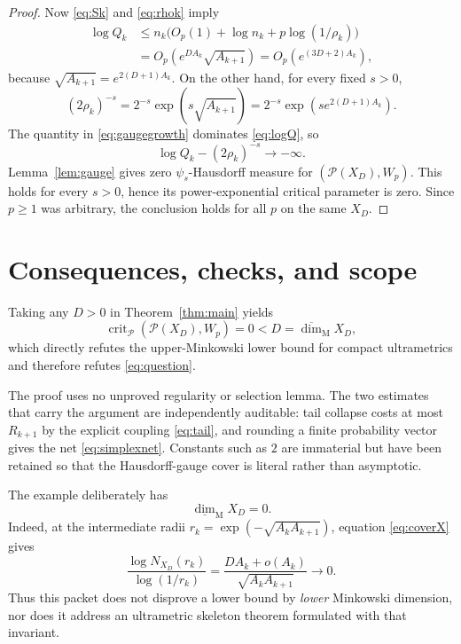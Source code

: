 \documentclass[11pt]{article}
\newcommand{\Pcal}{\mathscr P}
\newcommand{\Prob}{\mathcal P}
\newcommand{\Mdim}{\overline{\dim}_{\mathrm M}}
\begin{document}
\begin{proof}
Now \eqref{eq:Sk} and \eqref{eq:rhok} imply
\[
 \begin{aligned}
 \log Q_k
 &\leq n_k\bigl(O_p(1)+\log n_k+p\log(1/\rho_k)\bigr)\\
 &=O_p\!\left(
       e^{DA_k}\sqrt{A_{k+1}}
     \right)
 =O_p\!\left(e^{(3D+2)A_k}\right),
 \end{aligned}
\tag{10}\label{eq:logQ}
\]
because $\sqrt{A_{k+1}}=e^{2(D+1)A_k}$.  On the other hand, for every
fixed $s>0$,
\[
 (2\rho_k)^{-s}
 =2^{-s}\exp\!\left(s\sqrt{A_{k+1}}\right)
 =2^{-s}\exp\!\left(s e^{2(D+1)A_k}\right).
\tag{11}\label{eq:gaugegrowth}
\]
The quantity in \eqref{eq:gaugegrowth} dominates \eqref{eq:logQ}, so
\[
                       \log Q_k-(2\rho_k)^{-s}\longrightarrow-\infty.
\]
Lemma~\ref{lem:gauge} gives zero $\psi_s$-Hausdorff measure for
$(\Prob(X_D),W_p)$.  This holds for every $s>0$, hence its
power-exponential critical parameter is zero.  Since $p\geq1$ was arbitrary,
the conclusion holds for all $p$ on the same $X_D$.
\end{proof}

\section{Consequences, checks, and scope}

Taking any $D>0$ in Theorem~\ref{thm:main} yields
\[
       \operatorname{crit}_{\Pcal}(\Prob(X_D),W_p)=0
       <D=\Mdim X_D,
\]
which directly refutes the upper-Minkowski lower bound for compact
ultrametrics and therefore refutes \eqref{eq:question}.

The proof uses no unproved regularity or selection lemma.  The two estimates
that carry the argument are independently auditable: tail collapse costs at
most $R_{k+1}$ by the explicit coupling \eqref{eq:tail}, and rounding a finite
probability vector gives the net \eqref{eq:simplexnet}.  Constants such as
$2$ are immaterial but have been retained so that the Hausdorff-gauge cover
is literal rather than asymptotic.

The example deliberately has
\[
                        \underline{\dim}_{\mathrm M}X_D=0.
\]
Indeed, at the intermediate radii
$r_k=\exp(-\sqrt{A_kA_{k+1}})$, equation \eqref{eq:coverX} gives
\[
 \frac{\log N_{X_D}(r_k)}{\log(1/r_k)}
 =\frac{DA_k+o(A_k)}{\sqrt{A_kA_{k+1}}}\longrightarrow0.
\]
Thus this packet does not disprove a lower bound by
\emph{lower} Minkowski dimension, nor does it address an ultrametric skeleton
theorem formulated with that invariant.
\end{document}
